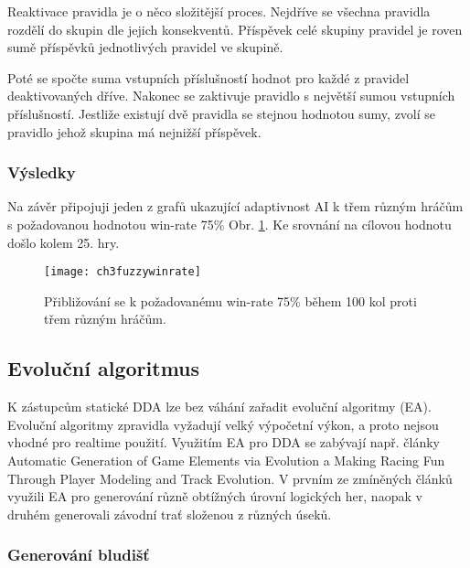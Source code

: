 Reaktivace pravidla je o něco složitější proces. Nejdříve se všechna pravidla rozdělí do skupin dle jejich konsekventů. Příspěvek celé skupiny pravidel je roven sumě příspěvků jednotlivých pravidel ve skupině. 

Poté se spočte suma vstupních příslušností hodnot pro každé z pravidel deaktivovaných dříve. Nakonec se zaktivuje pravidlo s největší sumou vstupních příslušností. Jestliže existují dvě pravidla se stejnou hodnotou sumy, zvolí se pravidlo jehož skupina má nejnižší příspěvek.

\subsubsection{Výsledky}

Na závěr připojuji jeden z grafů ukazující adaptivnost AI k třem různým hráčům s požadovanou hodnotou win-rate 75\% Obr. \ref{fig-ch3fuzzywinrate}. Ke srovnání na cílovou hodnotu došlo kolem 25. hry. 

\begin{figure}
  \centering
  \texttt{[image: ch3fuzzywinrate]}
	\caption{Přibližování se k požadovanému win-rate 75\% během 100 kol proti třem různým hráčům. \cite{25deadend} }
	\label{fig-ch3fuzzywinrate}
\end{figure}

\subsection{Evoluční algoritmus} \label{sec:evol}

K zástupcům statické DDA lze bez váhání zařadit evoluční algoritmy (EA). Evoluční algoritmy zpravidla vyžadují velký výpočetní výkon, a proto nejsou vhodné pro realtime použití. Využitím EA pro DDA se zabývají např. články Automatic Generation of Game Elements via Evolution\cite{17Evol} a Making Racing Fun Through Player Modeling
and Track Evolution\cite{EvolTrack}. V prvním ze zmíněných článků využili EA pro generování různě obtížných úrovní logických her, naopak v druhém generovali závodní trať složenou z různých úseků.

\subsubsection{Generování bludišť}

